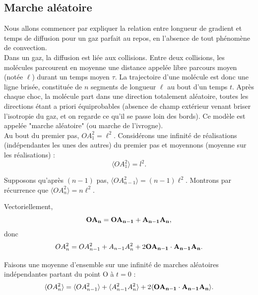 \documentclass[11pt,a4paper]{report}
\begin{document}
\subsection{Marche aléatoire}

Nous allons commencer par expliquer la relation entre longueur de gradient et temps de diffusion pour un gaz parfait au repos, en l'absence de tout phénomène de convection.\\

Dans un gaz, la diffusion est liée aux collisions. Entre deux collisions, les molécules parcourent en moyenne une distance appelée libre parcours moyen (notée $\ell$) durant un temps moyen $\tau$. La trajectoire d'une molécule est donc une ligne brisée, constituée de $n$ segments de longueur $\ell$ au bout d'un temps $t$. Après chaque choc, la molécule part dans une direction totalement aléatoire, toutes les directions étant a priori équiprobables (absence de champ extérieur venant briser l'isotropie du gaz, et on regarde ce qu'il se passe loin des bords). Ce modèle est appelée "marche aléatoire" (ou marche de l'ivrogne).\\

Au bout du premier pas, $OA_1^2 = \ell^2$. Considérons une infinité de réalisations (indépendantes les unes des autres) du premier pas et moyennons (moyenne sur les réalisations) :
\begin{equation}
	\langle OA_1^2 \rangle = l^2.
\end{equation}

Supposons qu'après $(n-1)$ pas, $\langle OA_{n-1}^2 \rangle = (n-1)\ell^2$. Montrons par récurrence que $\langle OA_n^2\rangle = n\ell^2$.

Vectoriellement,
\begin{equation}
	\bold{OA_n} = \bold{OA_{n-1}} + \bold{A_{n-1}A_n},
\end{equation}
donc
\begin{equation}
	OA_n^2 = OA_{n-1}^2 + A_{n-1}A_n^2 + 2\bold{OA_{n-1}}\cdot\bold{A_{n-1}A_n}.
\end{equation}

Faisons une moyenne d'ensemble sur une infinité de marches aléatoires indépendantes partant du point O à $t = 0$ :
\begin{equation}
	\langle OA_n^2 \rangle = \langle OA_{n-1}^2\rangle + \langle A_{n-1}^2 A_n^2 \rangle + 2\langle \bold{OA_{n-1}}\cdot\bold{A_{n-1}A_n}\rangle.
\end{equation}
\end{document}
